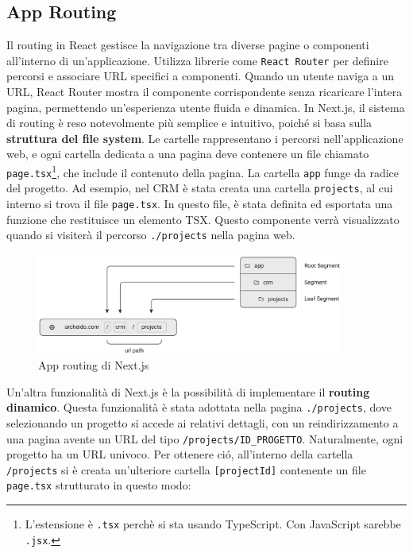 \documentclass[target=bach,aauheader=,style=]{thud}
\begin{document}
\subsection{App Routing}
Il routing in React gestisce la navigazione tra diverse pagine o componenti all'interno di un'applicazione. Utilizza librerie come \texttt{React Router} per definire percorsi e associare URL specifici a componenti. Quando un utente naviga a un URL, React Router mostra il componente corrispondente senza ricaricare l'intera pagina, permettendo un'esperienza utente fluida e dinamica. In Next.js, il sistema di routing è reso notevolmente più semplice e intuitivo, poiché si basa sulla \textbf{struttura del file system}. Le cartelle rappresentano i percorsi nell'applicazione web, e ogni cartella dedicata a una pagina deve contenere un file chiamato \texttt{page.tsx}\footnote{L'estensione è \texttt{.tsx} perchè si sta usando TypeScript. Con JavaScript sarebbe \texttt{.jsx}.}, che include il contenuto della pagina. La cartella \texttt{app} funge da radice del progetto. Ad esempio, nel CRM è stata creata una cartella \texttt{projects}, al cui interno si trova il file \texttt{page.tsx}. In questo file, è stata definita ed esportata una funzione che restituisce un elemento TSX. Questo componente verrà visualizzato quando si visiterà il percorso \texttt{./projects} nella pagina web.

\begin{figure}[H]
    \centering
    \includegraphics[width=0.9\textwidth]{img/routing.pdf} 
    \caption{App routing \cite{nextjsdocs2024} di Next.js}
\end{figure}

\noindent Un'altra funzionalità di Next.js è la possibilità di implementare il \textbf{routing dinamico}. Questa funzionalità è stata adottata nella pagina \texttt{./projects}, dove selezionando un progetto si accede ai relativi dettagli, con un reindirizzamento a una pagina avente un URL del tipo \texttt{/projects/ID\_PROGETTO}. Naturalmente, ogni progetto ha un URL univoco. Per ottenere ció, all'interno della cartella \texttt{/projects} si è creata un'ulteriore cartella \texttt{[projectId]} contenente un file \texttt{page.tsx} strutturato in questo modo:
\end{document}
